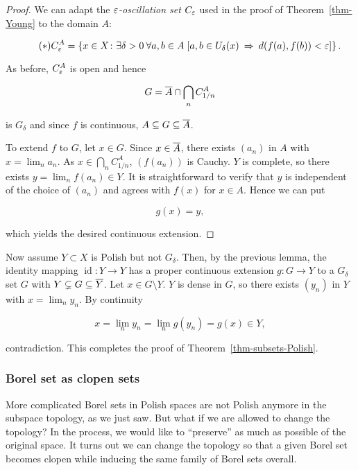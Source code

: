 \begin{proof}We can adapt the \textit{$\varepsilon$-oscillation set} $C_\varepsilon$ used in the proof of Theorem~\ref{thm-Young} to the domain $A$:

\begin{equation*}
\tag{$*$}
    C^A_\varepsilon = \left \{ x \in X \colon \exists \delta > 0 \: \forall a,b \in A \; [ a,b \in U_\delta(x) \: \Rightarrow \: d(f(a),f(b)) < \varepsilon  ] \right \}.
\end{equation*}

As before, $C^A_\varepsilon$ is open and hence

\begin{equation}
G = \overline{A} \cap \bigcap_n C^A_{1/n}
\end{equation}

is $G_\delta$ and since $f$ is continuous, $A \subseteq G \subseteq \overline{A}$.

To extend $f$ to $G$, let $x \in G$. Since $x \in \overline{A}$, there exists $(a_n)$ in $A$ with $x = \lim_n a_n$. As $x \in \bigcap_n C^A_{1/n}$, $(f(a_n))$ is Cauchy. $Y$ is complete, so there exists $y = \lim_n f(a_n) \in Y$. It is straightforward to verify that $y$ is independent of the choice of $(a_n)$ and agrees with $f(x)$ for $x \in A$. Hence we can put

\begin{equation}
g(x) = y,
\end{equation}

which yields the desired continuous extension.

\end{proof}Now assume $Y \subset X$ is Polish but not $G_\delta$. Then, by the previous lemma, the identity mapping $\operatorname{id}: Y \to Y$ has a proper continuous extension $g: G \to Y$ to a $G_\delta$ set $G$ with $Y \subsetneq G \subseteq \overline{Y}$. Let $x \in G\setminus Y$. $Y$ is dense in $G$, so there exists $(y_n)$ in $Y$ with $x = \lim_n y_n$. By continuity

\begin{equation}
x = \lim_n y_n = \lim_n g(y_n) = g(x) \in Y,
\end{equation}

contradiction. This completes the proof of Theorem~\ref{thm-subsets-Polish}.

\subsubsection{Borel set as clopen sets}

More complicated Borel sets in Polish spaces are not Polish anymore in the subspace topology, as we just saw. But what if we are allowed to change the topology? In the process, we would like to ``preserve'' as much as possible of the original space. It turns out we can change the topology so that a given Borel set becomes clopen while inducing the same family of Borel sets overall.

